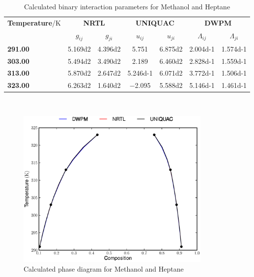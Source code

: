 \begin{landscape}
\vspace*{\fill}
\begin{table}[h]
\caption{Calculated binary interaction parameters for Methanol and Heptane} 
\centering
\begin{tabular}{lcccccc}
\toprule
\textbf{Temperature}/$\mathrm{K}$&\multicolumn{2}{c}{\textbf{NRTL}}&\multicolumn{2}{c}{\textbf{UNIQUAC}}&\multicolumn{2}{c}{\textbf{DWPM}}\\
\cmidrule(r){2-7}
&$g_{ij}$&$g_{ji}$&$u_{ij}$&$u_{ji}$&$\Lambda_{ij}$&$\Lambda_{ji}$\\
\midrule
\textbf{ 291.00 } & \num{5.169d2} & \num{4.396d2} & \num{5.751} & \num{6.875d2} & \num{2.004d-1} & \num{1.574d-1}\\
\textbf{ 303.00 } & \num{5.494d2} & \num{3.490d2} & \num{2.189} & \num{6.460d2} & \num{2.828d-1} & \num{1.559d-1}\\
\textbf{ 313.00 } & \num{5.870d2} & \num{2.647d2} & \num{5.246d-1} & \num{6.071d2} & \num{3.772d-1} & \num{1.506d-1}\\
\textbf{ 323.00 } & \num{6.263d2} & \num{1.640d2} & \num{-2.095} & \num{5.588d2} & \num{5.146d-1} & \num{1.461d-1}\\
\bottomrule
\end{tabular}\\
\label{methanol-heptaneTable}
\end{table}
\vspace*{\fill}
\end{landscape}

\begin{figure}[hp]
\centering
\includegraphics[width = 0.85\textwidth]{Results_Parts/BinaryParams/methanol-heptane/PhaseDiagram.eps}
\caption{Calculated phase diagram for Methanol and Heptane} \label{methanol-heptaneFigure}
\end{figure}\

